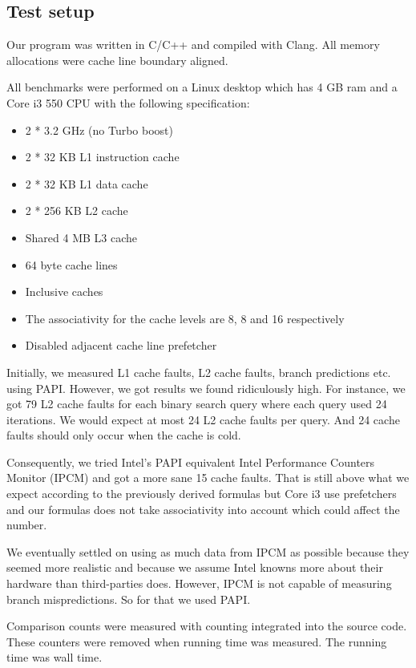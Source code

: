 \subsection{Test setup}

Our program was written in C/C++ and compiled with Clang. All memory allocations were cache line boundary aligned.

All benchmarks were performed on a Linux desktop which has 4 GB ram and a Core i3 550 CPU with the following specification:

\begin{itemize}
\item 2 * 3.2 GHz (no Turbo boost)
\item 2 * 32 KB L1 instruction cache
\item 2 * 32 KB L1 data cache
\item 2 * 256 KB L2 cache
\item Shared 4 MB L3 cache
\item 64 byte cache lines
\item Inclusive caches
\item The associativity for the cache levels are 8, 8 and 16 respectively
\item Disabled adjacent cache line prefetcher
\end{itemize}

Initially, we measured L1 cache faults, L2 cache faults, branch predictions etc. using PAPI. However, we got results we found ridiculously high.
For instance, we got 79 L2 cache faults for each binary search query where each query used 24 iterations.
We would expect at most 24 L2 cache faults per query. And 24 cache faults should only occur when the cache is cold.

Consequently, we tried Intel's PAPI equivalent Intel Performance Counters Monitor (IPCM) and got a more sane 15 cache faults.
That is still above what we expect according to the previously derived formulas but Core i3 use prefetchers and our formulas does not take associativity into account which could affect the number.

We eventually settled on using as much data from IPCM as possible because they seemed more realistic and because we
assume Intel knowns more about their hardware than third-parties does. However, IPCM is not capable of measuring branch mispredictions. So for that we used PAPI.

Comparison counts were measured with counting integrated into the source code. These counters were removed when running time was measured. The running time was wall time.

